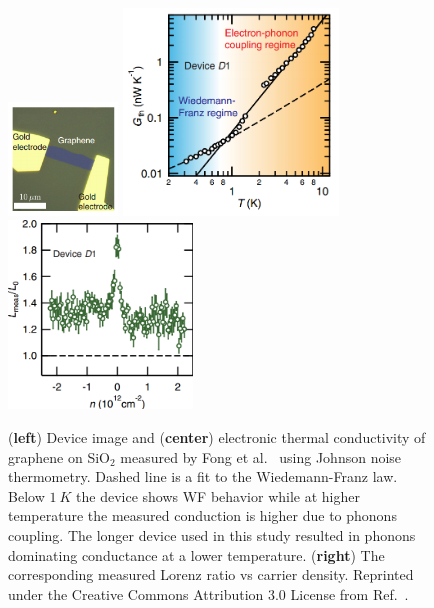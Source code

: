 \begin{figure}
\centering
\includegraphics[height=30mm, valign=t]{figures/high_density_graphene/Fong_picture.png}
\includegraphics[height=55mm, valign=t]{figures/high_density_graphene/Fong_Gth.png}
\includegraphics[height=50mm, valign=t]{figures/high_density_graphene/Fong_L.png}
\caption{(\textbf{left}) Device image and (\textbf{center}) electronic thermal conductivity of graphene on SiO$_2$ measured by Fong et al.~\cite{fong_measurement_2013} using Johnson noise thermometry. Dashed line is a fit to the Wiedemann-Franz law. Below $1~K$ the device shows WF behavior while at higher temperature the measured conduction is higher due to phonons coupling. The longer device used in this study resulted in phonons dominating conductance at a lower temperature. (\textbf{right}) The corresponding measured Lorenz ratio vs carrier density. Reprinted under the Creative Commons Attribution 3.0 License from Ref.~\cite{fong_measurement_2013}.}
\label{fig:Fong_Gth}
\end{figure}
